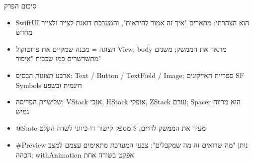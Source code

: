 \begin{tcbsummary}{סיכום הפרק}
\begin{itemize}
  \item SwiftUI הוא הצהרתי: מתארים "איך זה אמור להיראות", והמערכת דואגת לצייר ולצייר מחדש
  \item תצוגה = מבנה שמקיים את פרוטוקול View; body מתאר את הממשק; משנים מתשרשרים כמו שכבות "איפור"
  \item ארבע תצוגות הבסיס: Text / Button / TextField / Image; ספריית האייקונים SF Symbols חינמית ובשפע
  \item שלישיית הפריסה: VStack אנכי, HStack אופקי, ZStack עורם; Spacer הוא מרווח גמיש
  \item @State מעיר את הממשק לחיים; \$ מספק קישור דו-כיווני לשדה הקלט
  \item \#Preview נותן "מה שרואים זה מה שמקבלים"; צבעי המערכת מתאימים עצמם למצב הכהה; withAnimation אפקט בשורה אחת
\end{itemize}

\end{tcbsummary}

